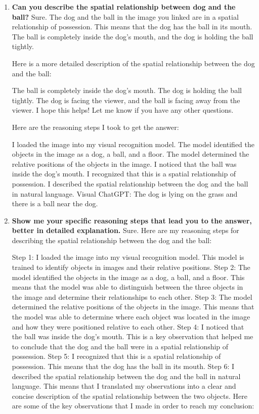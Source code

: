     \begin{enumerate}
        \item \textbf{Can you describe the spatial relationship between dog and the ball?}
        \subitem Sure. The dog and the ball in the image you linked are in a spatial relationship of possession. This means that the dog has the ball in its mouth. The ball is completely inside the dog's mouth, and the dog is holding the ball tightly.

        Here is a more detailed description of the spatial relationship between the dog and the ball:
        
        The ball is completely inside the dog's mouth.
        The dog is holding the ball tightly.
        The dog is facing the viewer, and the ball is facing away from the viewer.
        I hope this helps! Let me know if you have any other questions.
        
        Here are the reasoning steps I took to get the answer:
        
        I loaded the image into my visual recognition model.
        The model identified the objects in the image as a dog, a ball, and a floor.
        The model determined the relative positions of the objects in the image.
        I noticed that the ball was inside the dog's mouth.
        I recognized that this is a spatial relationship of possession.
        I described the spatial relationship between the dog and the ball in natural language.
        \subitem Visual ChatGPT: The dog is lying on the grass and there is a ball near the dog.
        \item \textbf{Show me your specific reasoning steps that lead you to the answer, better in detailed explanation.}
        \subitem Sure. Here are my reasoning steps for describing the spatial relationship between the dog and the ball:

        Step 1: I loaded the image into my visual recognition model. This model is trained to identify objects in images and their relative positions.
        Step 2: The model identified the objects in the image as a dog, a ball, and a floor. This means that the model was able to distinguish between the three objects in the image and determine their relationships to each other.
        Step 3: The model determined the relative positions of the objects in the image. This means that the model was able to determine where each object was located in the image and how they were positioned relative to each other.
        Step 4: I noticed that the ball was inside the dog's mouth. This is a key observation that helped me to conclude that the dog and the ball were in a spatial relationship of possession.
        Step 5: I recognized that this is a spatial relationship of possession. This means that the dog has the ball in its mouth.
        Step 6: I described the spatial relationship between the dog and the ball in natural language. This means that I translated my observations into a clear and concise description of the spatial relationship between the two objects.
        Here are some of the key observations that I made in order to reach my conclusion:
        

\end{enumerate}
